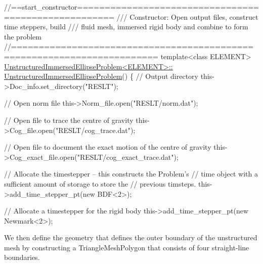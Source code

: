\begin{DoxyCodeInclude}
\textcolor{comment}{//==start\_constructor=====================================================}
\textcolor{comment}{/// Constructor: Open output files, construct time steppers, build }
\textcolor{comment}{}\textcolor{comment}{///  fluid mesh, immersed rigid body and combine to form the problem}
\textcolor{comment}{}\textcolor{comment}{//========================================================================}
\textcolor{keyword}{template}<\textcolor{keyword}{class} ELEMENT>
\hyperlink{classUnstructuredImmersedEllipseProblem_a544a35f261200bb4a4e29a88faa1a69c}{UnstructuredImmersedEllipseProblem<ELEMENT>::}
\hyperlink{classUnstructuredImmersedEllipseProblem_a544a35f261200bb4a4e29a88faa1a69c}{UnstructuredImmersedEllipseProblem}()
\{ 
 \textcolor{comment}{// Output directory}
 this->Doc\_info.set\_directory(\textcolor{stringliteral}{"RESLT"});

 \textcolor{comment}{// Open norm file}
 this->Norm\_file.open(\textcolor{stringliteral}{"RESLT/norm.dat"});

 \textcolor{comment}{// Open file to trace the centre of gravity}
 this->Cog\_file.open(\textcolor{stringliteral}{"RESLT/cog\_trace.dat"});

 \textcolor{comment}{// Open file to document the exact motion of the centre of gravity}
 this->Cog\_exact\_file.open(\textcolor{stringliteral}{"RESLT/cog\_exact\_trace.dat"});

 \textcolor{comment}{// Allocate the timestepper -- this constructs the Problem's }
 \textcolor{comment}{// time object with a sufficient amount of storage to store the}
 \textcolor{comment}{// previous timsteps. }
 this->add\_time\_stepper\_pt(\textcolor{keyword}{new} BDF<2>);

 \textcolor{comment}{// Allocate a timestepper for the rigid body}
 this->add\_time\_stepper\_pt(\textcolor{keyword}{new} Newmark<2>);

\end{DoxyCodeInclude}


We then define the geometry that defines the outer boundary of the unstructured mesh by constructing a {\ttfamily Triangle\+Mesh\+Polygon} that consists of four straight-\/line boundaries.


